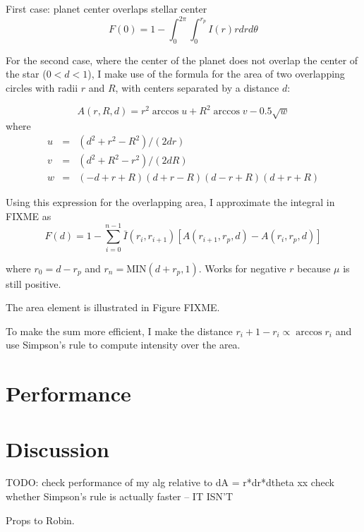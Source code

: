 \documentclass[12pt,preprint]{aastex}
\begin{document}
First case: planet center overlaps stellar center
\begin{equation}
F(0) = 1 - \int_0^{2\pi}{\int_0^{r_p}{I(r)r dr d\theta}}
\end{equation}

For the second case, where the center of the planet does not overlap the center of the star ($0<d<1$), I make use of the formula for the area of two overlapping circles with radii $r$ and $R$, with centers separated by a distance $d$:

\begin{equation}
A(r, R, d) = r^2\arccos{u} + R^2\arccos{v} - 0.5\sqrt{w}
\end{equation}
where
\begin{eqnarray}
u &=& (d^2+r^2-R^2)/(2dr)\\
v &=& (d^2 + R^2 -r^2)/(2dR) \\
w &=& (-d+r+R)(d+r-R)(d-r+R)(d+r+R)
\end{eqnarray}

Using this expression for the overlapping area, I approximate the integral in FIXME as
\begin{equation}
F(d) = 1 - \sum_{i=0}^{n-1}{\bar{I}(r_i, r_{i+1}) [A(r_{i+1}, r_p, d) - A(r_i, r_p, d)]}
\end{equation}

where $r_0 = d - r_p$ and $r_n = \textrm{MIN}(d+r_p, 1)$.  Works for negative $r$ because $\mu$ is still positive.

The area element is illustrated in Figure FIXME.


To make the sum more efficient, I make the distance $r_i+1 - r_i \propto \arccos{r_i}$  and use Simpson's rule to compute intensity over the area.


\section{Performance}

\section{Discussion}



TODO:
check performance of my alg relative to dA = r*dr*dtheta
xx check whether Simpson's rule is actually faster -- IT ISN'T


\acknowledgments
Props to Robin.



\end{document}
